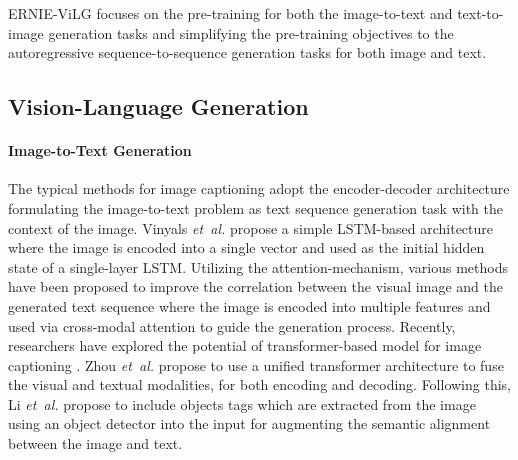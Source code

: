 \documentclass{article}
\begin{document}
ERNIE-ViLG focuses on the pre-training for both the image-to-text and text-to-image generation tasks and simplifying the pre-training objectives to the autoregressive sequence-to-sequence generation tasks for both image and text.


\subsection{Vision-Language Generation}
\paragraph{Image-to-Text Generation}
The typical methods for image captioning adopt the encoder-decoder architecture formulating the image-to-text problem as text sequence generation task with the context of the image. Vinyals {\em et\ al.}  \cite{vinyals2015show} propose a simple LSTM-based  architecture where the image is encoded into a single vector and used as the initial hidden state of a single-layer LSTM. Utilizing the attention-mechanism, various methods \cite{xu2015show,anderson2018bottom,huang2019attention} have been proposed to improve the correlation between the visual image and the generated text sequence where the image is encoded into multiple features and used via cross-modal attention to guide the generation process. 
Recently, researchers have explored the potential of transformer-based model for image captioning \cite{sharma2018conceptual,herdade2019image,zhou2020unified}. 
Zhou {\em et\ al.} \cite{zhou2020unified} propose to use a unified transformer architecture to fuse the visual and textual modalities, for both encoding and decoding. Following this, Li {\em et\ al.} \cite{li2020oscar} propose to include objects tags which are extracted from the image using an object detector into the input for augmenting the semantic alignment between the image and text.
\end{document}
